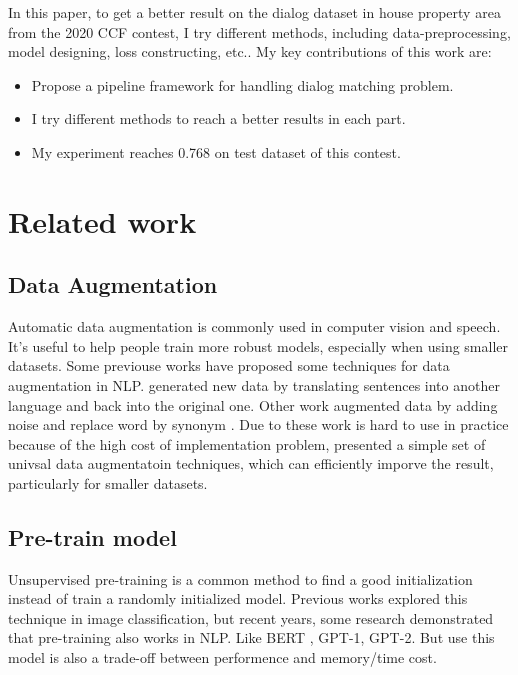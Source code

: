 \documentclass[10pt,twocolumn,letterpaper]{article}
\begin{document}
%
In this paper, to get a better result on the dialog dataset in house property area from the 2020 CCF contest, I try different methods, including data{-}preprocessing, model designing, loss constructing, etc.. My key contributions of this work are:%

%
\begin{itemize}%
\item%
Propose a pipeline framework for handling dialog matching problem.%
\item%
I try different methods to reach a better results in each part.%
\item%
My experiment reaches 0.768 on test dataset of this contest.%
\end{itemize}%
%

%

%
\section{Related work}%

%
\subsection{Data Augmentation}%

%
Automatic data augmentation is commonly used in computer vision and speech. It's useful to help people train more robust models, especially when using smaller datasets. Some previouse works have proposed some techniques for data augmentation in NLP. \cite{Qanet} generated new data by translating sentences into another language and back into the original one. Other work augmented data by adding noise \cite{Data} and replace word by synonym \cite{Contextual}. Due to these work is hard to use in practice because of the high cost of implementation problem, \cite{EDA} presented a simple set of univsal data augmentatoin techniques, which can efficiently imporve the result, particularly for smaller datasets.%

%

%
\subsection{Pre{-}train model}%

%
Unsupervised pre{-}training is a common method to find a good initialization instead of train a randomly initialized model. Previous works explored this technique in image classification, but recent years, some research demonstrated that pre{-}training also works in NLP. Like BERT \cite{BERT}, GPT{-}1\cite{Improving}, GPT{-}2\cite{Language}. But use this model is also a trade{-}off between performence and memory/time cost.%
\end{document}
